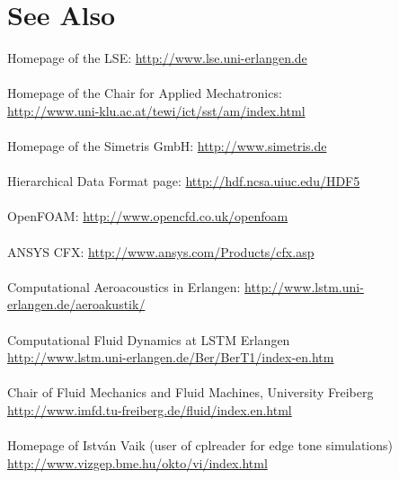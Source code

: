 \documentclass[a4paper,10pt]{article}
\begin{document}
\newpage
\section{See Also}

Homepage of the LSE: \url{http://www.lse.uni-erlangen.de}\\\\
Homepage of the Chair for Applied Mechatronics:\\\url{http://www.uni-klu.ac.at/tewi/ict/sst/am/index.html}\\\\
Homepage of the Simetris GmbH: \url{http://www.simetris.de}\\\\
Hierarchical Data Format page: \url{http://hdf.ncsa.uiuc.edu/HDF5}\\\\
OpenFOAM: \url{http://www.opencfd.co.uk/openfoam}\\\\
ANSYS CFX: \url{http://www.ansys.com/Products/cfx.asp}\\\\
Computational Aeroacoustics in Erlangen:
\url{http://www.lstm.uni-erlangen.de/aeroakustik/}\\\\
Computational Fluid Dynamics at LSTM
Erlangen\\\url{http://www.lstm.uni-erlangen.de/Ber/BerT1/index-en.htm}\\\\
Chair of Fluid Mechanics and Fluid Machines, University Freiberg\\\url{http://www.imfd.tu-freiberg.de/fluid/index.en.html}\\\\
Homepage of István Vaik (user of cplreader for edge tone simulations) \\\url{http://www.vizgep.bme.hu/okto/vi/index.html}\\\\


\end{document}
